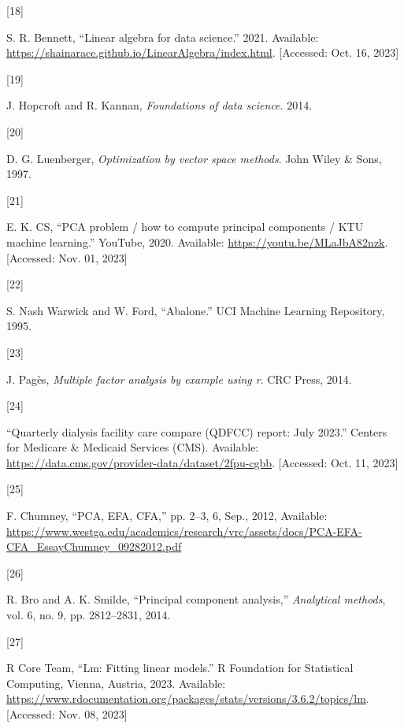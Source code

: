 \documentclass[
  letterpaper,
  DIV=11,
  numbers=noendperiod]{scrreprt}
\newlength{\cslhangindent}
\newlength{\csllabelwidth}
\newlength{\cslentryspacingunit} %
\newenvironment{CSLReferences}[2] %
 {%
  \setlength{\parindent}{0pt}
  \ifodd #1
  \let\oldpar\par
  \def\par{\hangindent=\cslhangindent\oldpar}
  \fi
  \setlength{\parskip}{#2\cslentryspacingunit}
 }%
 {}
\newcommand{\CSLLeftMargin}[1]{\parbox[t]{\csllabelwidth}{#1}}
\newcommand{\CSLRightInline}[1]{\parbox[t]{\linewidth - \csllabelwidth}{#1}\break}
\begin{document}
\begin{CSLReferences}{0}{0}
\leavevmode{}%
\CSLLeftMargin{{[}18{]} }%
\CSLRightInline{S. R. Bennett, {``Linear algebra for data science.''}
2021. Available:
\url{https://shainarace.github.io/LinearAlgebra/index.html}.
{[}Accessed: Oct. 16, 2023{]}}

\leavevmode{}%
\CSLLeftMargin{{[}19{]} }%
\CSLRightInline{J. Hopcroft and R. Kannan, \emph{Foundations of data
science}. 2014.}

\leavevmode{}%
\CSLLeftMargin{{[}20{]} }%
\CSLRightInline{D. G. Luenberger, \emph{Optimization by vector space
methods}. John Wiley \& Sons, 1997.}

\leavevmode{}%
\CSLLeftMargin{{[}21{]} }%
\CSLRightInline{E. K. CS, {``PCA problem / how to compute principal
components / KTU machine learning.''} YouTube, 2020. Available:
\url{https://youtu.be/MLaJbA82nzk}. {[}Accessed: Nov. 01, 2023{]}}

\leavevmode{}%
\CSLLeftMargin{{[}22{]} }%
\CSLRightInline{S. Nash Warwick and W. Ford, {``{Abalone}.''} UCI
Machine Learning Repository, 1995.}

\leavevmode{}%
\CSLLeftMargin{{[}23{]} }%
\CSLRightInline{J. Pagès, \emph{Multiple factor analysis by example
using r}. CRC Press, 2014.}

\leavevmode{}%
\CSLLeftMargin{{[}24{]} }%
\CSLRightInline{{``Quarterly dialysis facility care compare (QDFCC)
report: July 2023.''} Centers for Medicare \& Medicaid Services (CMS).
Available: \url{https://data.cms.gov/provider-data/dataset/2fpu-cgbb}.
{[}Accessed: Oct. 11, 2023{]}}

\leavevmode{}%
\CSLLeftMargin{{[}25{]} }%
\CSLRightInline{F. Chumney, {``PCA, EFA, CFA,''} pp. 2--3, 6, Sep.,
2012, Available:
\url{https://www.westga.edu/academics/research/vrc/assets/docs/PCA-EFA-CFA_EssayChumney_09282012.pdf}}

\leavevmode{}%
\CSLLeftMargin{{[}26{]} }%
\CSLRightInline{R. Bro and A. K. Smilde, {``Principal component
analysis,''} \emph{Analytical methods}, vol. 6, no. 9, pp. 2812--2831,
2014.}

\leavevmode{}%
\CSLLeftMargin{{[}27{]} }%
\CSLRightInline{R Core Team, {``Lm: Fitting linear models.''} R
Foundation for Statistical Computing, Vienna, Austria, 2023. Available:
\url{https://www.rdocumentation.org/packages/stats/versions/3.6.2/topics/lm}.
{[}Accessed: Nov. 08, 2023{]}}


\end{CSLReferences}
\end{document}
